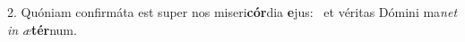 2. Quóniam confirmáta est super nos miseri\textbf{cór}dia \textbf{e}jus: \ast\  et véritas Dómini ma\textit{net} \textit{in} \textit{æ}\textbf{tér}num.\

